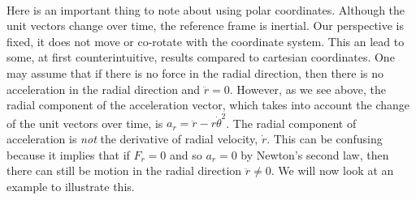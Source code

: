 \documentclass[../classical_mechanics.tex]{subfiles}
\begin{document}
        \paragraph{}
        Here is an important thing to note about using polar coordinates.
        Although the unit vectors change over time, the reference frame is inertial.
        Our perspective is fixed, it does not move or co-rotate with the coordinate system.
        This an lead to some, at first counterintuitive, results compared to cartesian coordinates.
        One may assume that if there is no force in the radial direction, then there is no acceleration in the radial direction and $\ddot{r}=0$.
        However, as we see above, the radial component of the acceleration vector, which takes into account the change of the unit vectors over time, is $a_r=\ddot{r}-r\dot{\theta}^2$.
        The radial component of acceleration is \textit{not} the derivative of radial velocity, $\dot{r}$.
        This can be confusing because it implies that if $F_r=0$ and so $a_r=0$ by Newton's second law, then there can still be motion in the radial direction $\ddot{r}\neq0$.
        We will now look at an example to illustrate this.
\end{document}
